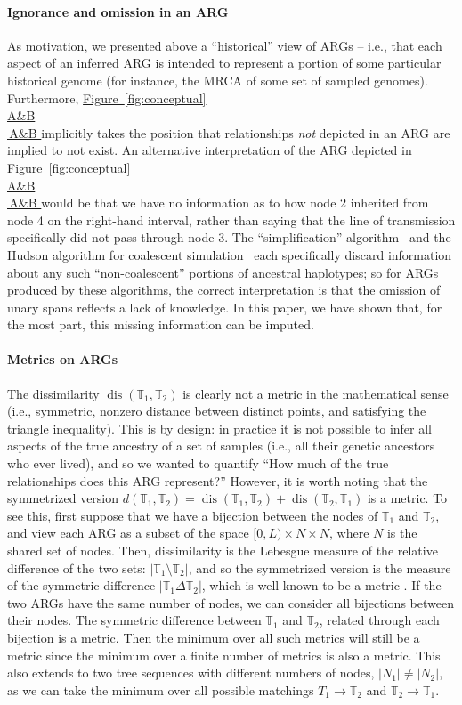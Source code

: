 \documentclass[10pt,twoside,lineno]{gsajnl}
\newcommand{\T}{\mathbb{T}}
\newcommand{\dis}{\operatorname{dis}}
\newcommand*{\figref}[2][]{%
	\hyperref[{#2}]{%
		Figure~\ref*{#2}%
		\ifx\\#1\\%
		\else
		\,#1%
		\fi
	}%
}
\begin{document}
\paragraph{Ignorance and omission in an ARG}
As motivation, we presented above a ``historical'' view of ARGs --
i.e., that each aspect of an inferred ARG is intended to represent
a portion of some particular historical genome
(for instance, the MRCA of some set of sampled genomes).
Furthermore, \figref[A\&B]{fig:conceptual} implicitly takes the position
that relationships \emph{not} depicted in an ARG are implied to not exist.
An alternative interpretation
of the ARG depicted in \figref[A\&B]{fig:conceptual} would be that we have no information as to 
how node 2 inherited from node 4 on the right-hand interval,
rather than saying that the line of transmission specifically did not pass
through node 3.
The ``simplification'' algorithm~\citep{kelleher2018efficient}
and the Hudson algorithm for coalescent
simulation~\citep{hudson1983properties,kelleher2016efficient}
each specifically discard information about any such ``non-coalescent'' portions of ancestral haplotypes;
so for ARGs produced by these algorithms, the correct interpretation is that
the omission of unary spans reflects a lack of knowledge.
In this paper, we have shown that, for the most part, this missing information can be imputed.

\paragraph{Metrics on ARGs}
The dissimilarity $\dis(\T_1,\T_2)$ is clearly not a metric in the mathematical sense
(i.e., symmetric, nonzero distance between distinct points, and satisfying the triangle inequality).
This is by design: in practice it is not possible to infer all aspects
of the true ancestry of a set of samples (i.e., all their genetic ancestors who ever lived),
and so we wanted to quantify
``How much of the true relationships does this ARG represent?''
However, it is worth noting that the symmetrized version
$d(\T_1,\T_2) = \dis(\T_1,\T_2) + \dis(\T_2, \T_1)$ is a metric.
To see this, first suppose that we have a bijection between the nodes of $\T_1$ and $\T_2$,
and view each ARG as a subset of the space $[0,L) \times N \times N$,
where $N$ is the shared set of nodes.
Then, dissimilarity is the Lebesgue measure of the relative difference of the two sets:
$|\T_1 \setminus \T_2|$,
and so the symmetrized version is the measure of the symmetric difference
$|\T_1\Delta\T_2|$,
which is well-known to be a metric \citep{rudin1976principles}. 
If the two ARGs have the same number of nodes,
we can consider all bijections between their nodes.
The symmetric difference between $\T_1$ and $\T_2$,
related through each bijection is a metric.
Then the minimum over all such metrics will still be a metric
since the minimum over a finite number of metrics is also a metric.
This also extends to two tree sequences with different numbers of nodes,
$|N_1|\neq|N_2|$, as we can take the minimum over all possible matchings $T_1\to\T_2$ and $\T_2\to\T_1$.
\end{document}
